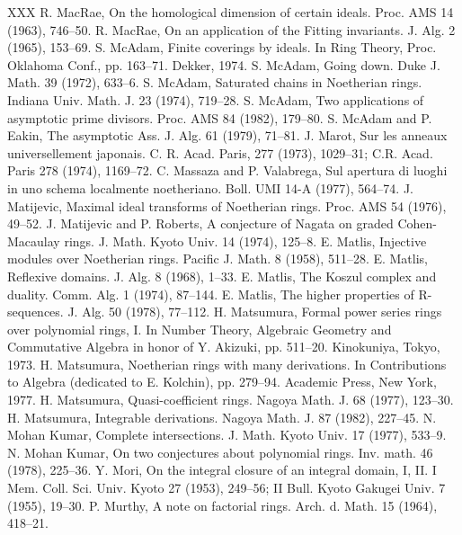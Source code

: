 \begin{thebibliography}{XXX}
 R. MacRae, On the homological dimension of certain ideals. Proc. AMS 14 (1963), 746--50.
 R. MacRae, On an application of the Fitting invariants. J. Alg. 2 (1965), 153--69.
 S. McAdam, Finite coverings by ideals. In Ring Theory, Proc. Oklahoma Conf., pp. 163--71. Dekker, 1974.
 S. McAdam, Going down. Duke J. Math. 39 (1972), 633--6.
 S. McAdam, Saturated chains in Noetherian rings. Indiana Univ. Math. J. 23 (1974), 719--28.
 S. McAdam, Two applications of asymptotic prime divisors. Proc. AMS 84 (1982), 179--80.
 S. McAdam and P. Eakin, The asymptotic Ass. J. Alg. 61 (1979), 71--81.
 J. Marot, Sur les anneaux universellement japonais. C. R. Acad. Paris, 277 (1973), 1029--31; C.R. Acad. Paris 278 (1974), 1169--72.
 C. Massaza and P. Valabrega, Sul apertura di luoghi in uno schema localmente noetheriano. Boll. UMI 14-A (1977), 564--74.
 J. Matijevic, Maximal ideal transforms of Noetherian rings. Proc. AMS 54 (1976), 49--52.
 J. Matijevic and P. Roberts, A conjecture of Nagata on graded Cohen-Macaulay rings. J. Math. Kyoto Univ. 14 (1974), 125--8.
 E. Matlis, Injective modules over Noetherian rings. Pacific J. Math. 8 (1958), 511--28.
 E. Matlis, Reflexive domains. J. Alg. 8 (1968), 1--33.
 E. Matlis, The Koszul complex and duality. Comm. Alg. 1 (1974), 87--144.
 E. Matlis, The higher properties of R-sequences. J. Alg. 50 (1978), 77--112.
 H. Matsumura, Formal power series rings over polynomial rings, I. In Number Theory, Algebraic Geometry and Commutative Algebra in honor of Y. Akizuki, pp. 511--20. Kinokuniya, Tokyo, 1973.
 H. Matsumura, Noetherian rings with many derivations. In Contributions to Algebra (dedicated to E. Kolchin), pp. 279--94. Academic Press, New York, 1977.
 H. Matsumura, Quasi-coefficient rings. Nagoya Math. J. 68 (1977), 123--30.
 H. Matsumura, Integrable derivations. Nagoya Math. J. 87 (1982), 227--45.
 N. Mohan Kumar, Complete intersections. J. Math. Kyoto Univ. 17 (1977), 533--9.
 N. Mohan Kumar, On two conjectures about polynomial rings. Inv. math. 46 (1978), 225--36.
 Y. Mori, On the integral closure of an integral domain, I, II. I Mem. Coll. Sci. Univ. Kyoto 27 (1953), 249--56; II Bull. Kyoto Gakugei Univ. 7 (1955), 19--30.
 P. Murthy, A note on factorial rings. Arch. d. Math. 15 (1964), 418--21.

\end{thebibliography}

